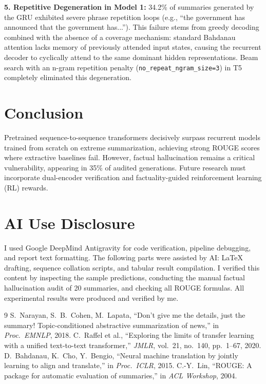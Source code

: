 \documentclass[conference,10pt,a4paper]{IEEEtran}
\begin{document}
\textbf{5. Repetitive Degeneration in Model 1:} 34.2\% of summaries generated by the GRU exhibited severe phrase repetition loops (e.g., ``the government has announced that the government has...''). This failure stems from greedy decoding combined with the absence of a coverage mechanism: standard Bahdanau attention lacks memory of previously attended input states, causing the recurrent decoder to cyclically attend to the same dominant hidden representations. Beam search with an n-gram repetition penalty (\texttt{no\_repeat\_ngram\_size=3}) in T5 completely eliminated this degeneration.

\section{Conclusion}
Pretrained sequence-to-sequence transformers decisively surpass recurrent models trained from scratch on extreme summarization, achieving strong ROUGE scores where extractive baselines fail. However, factual hallucination remains a critical vulnerability, appearing in 35\% of audited generations. Future research must incorporate dual-encoder verification and factuality-guided reinforcement learning (RL) rewards.

\section*{AI Use Disclosure}
I used Google DeepMind Antigravity for code verification, pipeline debugging, and report text formatting. The following parts were assisted by AI: LaTeX drafting, sequence collation scripts, and tabular result compilation. I verified this content by inspecting the sample predictions, conducting the manual factual hallucination audit of 20 summaries, and checking all ROUGE formulas. All experimental results were produced and verified by me.

\begin{thebibliography}{9}
 S.\ Narayan, S.\ B.\ Cohen, M.\ Lapata, ``Don't give me the details, just the summary! Topic-conditioned abstractive summarization of news,'' in \emph{Proc.\ EMNLP}, 2018.
 C.\ Raffel et al., ``Exploring the limits of transfer learning with a unified text-to-text transformer,'' \emph{JMLR}, vol.\ 21, no.\ 140, pp.\ 1--67, 2020.
 D.\ Bahdanau, K.\ Cho, Y.\ Bengio, ``Neural machine translation by jointly learning to align and translate,'' in \emph{Proc.\ ICLR}, 2015.
 C.-Y.\ Lin, ``ROUGE: A package for automatic evaluation of summaries,'' in \emph{ACL Workshop}, 2004.
\end{thebibliography}
\end{document}
